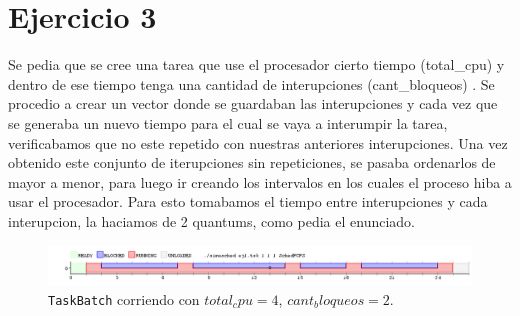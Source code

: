 \section{Ejercicio 3}
	Se pedia que se cree una tarea que use el procesador cierto tiempo (total_cpu) y dentro de ese tiempo tenga una cantidad de interupciones (cant_bloqueos) . Se procedio a crear un vector donde se guardaban las interupciones y cada vez que se generaba un nuevo tiempo para el cual se vaya a interumpir la tarea, verificabamos que no este repetido con nuestras anteriores interupciones. Una vez obtenido este conjunto de iterupciones sin repeticiones, se pasaba ordenarlos de mayor a menor, para luego ir creando los intervalos en los cuales el proceso hiba a usar el procesador. Para esto tomabamos el tiempo entre interupciones y cada interupcion, la haciamos de 2 quantums, como pedia el enunciado.

	\begin{figure}[ht]
		\begin{center}
			\includegraphics[width=1\columnwidth]{imagenes/ej1.png}
			\caption{\texttt{TaskBatch} corriendo con $total_cpu = 4$, $cant_bloqueos = 2$.}
		\end{center}
	\end{figure}

